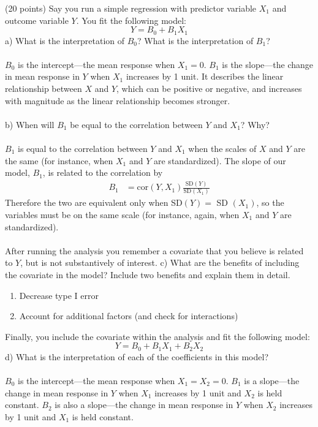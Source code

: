 \documentclass[onecolumn,10pt]{jhwhw}
\begin{document}
\clearpage
\problem{}%
(20 points) Say you run a simple regression with predictor variable $X_1$ and outcome variable $Y$. You fit the following model:
                $$Y = B_0 + B_1 X_1$$
a) What is the interpretation of $B_0$? What is the interpretation of $B_1$?\\
\\
$B_0$ is the intercept---the mean response when $X_1 = 0$. $B_1$ is the slope---the change in mean response in $Y$ when $X_1$ increases by 1 unit. It describes the linear relationship between $X$ and $Y$, which can be positive or negative, and increases with magnitude as the linear relationship becomes stronger.\\
\\
b) When will $B_1$ be equal to the correlation between $Y$ and $X_1$? Why?\\
\\
$B_1$ is equal to the correlation between $Y$ and $X_1$ when the scales of $X$ and $Y$ are the same (for instance, when $X_1$ and $Y$ are standardized).
The slope of our model, $B_1$, is related to the correlation by
\begin{align*}
B_1 &= \mbox{cor}(Y, X_1) \frac{\mbox{SD}(Y)}{\mbox{SD}(X_1)}
\end{align*}
Therefore the two are equivalent only when SD$(Y) = $ SD $(X_1)$, so the variables must be on the same scale (for instance, again, when $X_1$ and $Y$ are standardized).\\
\\
After running the analysis you remember a covariate that you believe is related to $Y$, but is not substantively of interest.
c) What are the benefits of including the covariate in the model? Include two benefits and explain them in detail.
\begin{enumerate}
\item Decrease type I error
\item Account for additional factors (and check for interactions)
\end{enumerate}
Finally, you include the covariate within the analysis and fit the following model:
                $$Y = B_0 + B_1 X_1 + B_2 X_2$$
d) What is the interpretation of each of the coefficients in this model?\\
\\
$B_0$ is the intercept---the mean response when $X_1 = X_2 = 0$. $B_1$ is a slope---the change in mean response in $Y$ when $X_1$ increases by 1 unit and $X_2$ is held constant. $B_2$ is also a slope---the change in mean response in $Y$ when $X_2$ increases by 1 unit and $X_1$ is held constant. \\
\end{document}

